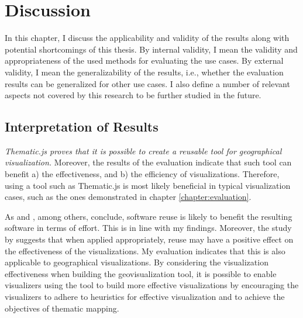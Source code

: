 
\chapter{Discussion}
\label{chapter:discussion}

In this chapter, I discuss the applicability and validity of the results along with potential shortcomings of this thesis. By internal validity, I mean the validity and appropriateness of the used methods for evaluating the use cases. By external validity, I mean the generalizability of the results, i.e., whether the evaluation results can be generalized for other use cases. I also define a number of relevant aspects not covered by this research to be further studied in the future.

\section{Interpretation of Results}

\emph{Thematic.js proves that it is possible to create a reusable tool for geographical visualization.} Moreover, the results of the evaluation indicate that such tool can benefit a) the effectiveness, and b) the efficiency of visualizations. Therefore, using a tool such as Thematic.js is most likely beneficial in typical visualization cases, such as the ones demonstrated in chapter \ref{chapter:evaluation}.

As \citet{boehm_managing_1999} and \citet{mohagheghi_quality_2007}, among others, conclude, software reuse is likely to benefit the resulting software in terms of effort. This is in line with my findings. Moreover, the study by \citet{bostock_protovis:_2009} suggests that when applied appropriately, reuse may have a positive effect on the effectiveness of the visualizations. My evaluation indicates that this is also applicable to geographical visualizations. By considering the visualization effectiveness when building the geovisualization tool, it is possible to enable visualizers using the tool to build more effective visualizations by encouraging the visualizers to adhere to heuristics for effective visualization and to achieve the objectives of thematic mapping.


